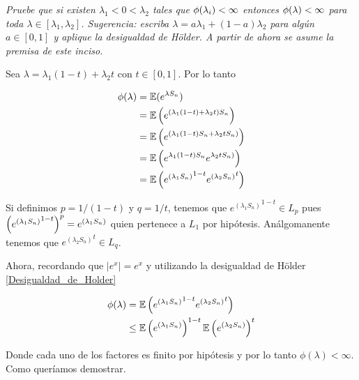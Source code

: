 \emph{
	Pruebe que si existen $\lambda_1<0<\lambda_2$ tales que $\phi\!\left( \lambda_i\right) <\infty$ entonces $\phi\!\left( \lambda\right) <\infty$ 
	para toda $\lambda\in [\lambda_1,\lambda_2]$. Sugerencia: escriba $\lambda=a\lambda_1+(1-a)\lambda_2$ para alg\'un $a\in [0,1]$ 
	y aplique la desigualdad de H\"older. A partir de ahora se asume la premisa de este inciso.
}

\afterstatement\par\null

Sea $\lambda = \lambda_1 (1-t) + \lambda_2 t$ con $t \in [0, 1]$. Por lo tanto 

\begin{align}
    \phi(\lambda)   &= \mathbb{E}(e^{\lambda S_n})                                              \\
                    &= \mathbb{E}\left( e^{(\lambda_1 (1-t) + \lambda_2 t) S_n}\right)                 \\
                    &= \mathbb{E}\left( e^{(\lambda_1 (1-t) S_n + \lambda_2 tS_n) }\right)             \\  
                    &= \mathbb{E}\left( e^{\lambda_1 (1-t) S_n} e^{\lambda_2 tS_n) }\right)            \\  
                    &= \mathbb{E}\left( {e^{(\lambda_1 S_n)}}^{1-t} {e^{(\lambda_2 S_n)}}^t\right)       
\end{align}

Si definimos $p = 1/(1-t)$ y $q = 1/t$, tenemos que
${e^{(\lambda_1 S_n)}}^{1-t} \in L_p$ pues $\left( {e^{(\lambda_1 S_n)}}^{1-t}\right) ^p = e^{(\lambda_1 S_n)}$ quien 
pertenece a $L_1$ por hipótesis. Análgomanente tenemos que  ${e^{(\lambda_2 S_n)}}^t \in L_q$.\par\null

Ahora, recordando que $|e^x| = e^x$ y utilizando la desigualdad de Hölder \eqref{Desigualdad_de_Holder}

\begin{align}
    \phi(\lambda)   &=      \mathbb{E}\left( {e^{(\lambda_1 S_n)}}^{1-t} {e^{(\lambda_2 S_n)}}^t\right)            \\      
                    &\leq   \mathbb{E}\left( e^{(\lambda_1 S_n)}\right) ^{1-t} \mathbb{E}\left( e^{(\lambda_2 S_n)}\right) ^t     
\end{align}\par\null

Donde cada uno de los factores es finito por hipótesis y por lo tanto $\phi(\lambda) < \infty$. Como queríamos demostrar.